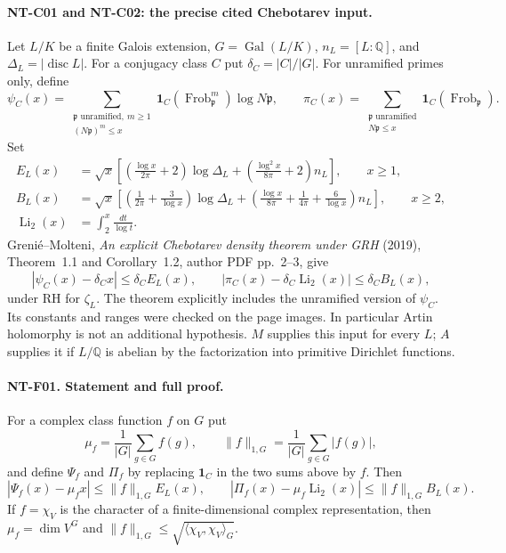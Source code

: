 \paragraph{NT-C01 and NT-C02: the precise cited Chebotarev input.}
Let $L/K$ be a finite Galois extension, $G=\operatorname{Gal}(L/K)$,
$n_L=[L:\mathbb Q]$, and $\Delta_L=|\operatorname{disc}L|$.
For a conjugacy class $C$ put $\delta_C=|C|/|G|$.  For unramified
primes only, define
\[
 \psi_C(x)=\sum_{\substack{\mathfrak p\text{ unramified},\ m\ge1\\
                    (N\mathfrak p)^m\le x}}
 \mathbf1_C(\operatorname{Frob}_{\mathfrak p}^{m})\log N\mathfrak p,
 \qquad
 \pi_C(x)=\sum_{\substack{\mathfrak p\text{ unramified}\\N\mathfrak p\le x}}
             \mathbf1_C(\operatorname{Frob}_{\mathfrak p}).
\]
Set
\begin{align*}
 E_L(x)&=\sqrt{x}\left[
       \left(\frac{\log x}{2\pi}+2\right)\log\Delta_L+
       \left(\frac{\log^2x}{8\pi}+2\right)n_L\right],\qquad x\ge1,\\
 B_L(x)&=\sqrt{x}\left[
       \left(\frac1{2\pi}+\frac3{\log x}\right)\log\Delta_L+
       \left(\frac{\log x}{8\pi}+\frac1{4\pi}+\frac6{\log x}\right)n_L
                         \right],\qquad x\ge2,\\
 \operatorname{Li}_2(x)&=\int_2^x\frac{dt}{\log t}.
\end{align*}
Greni\'e--Molteni, \emph{An explicit Chebotarev density theorem under GRH}
(2019), Theorem~1.1 and Corollary~1.2, author PDF pp.~2--3, give
\[
 |\psi_C(x)-\delta_Cx|\le\delta_C E_L(x),\qquad
 |\pi_C(x)-\delta_C\operatorname{Li}_2(x)|\le\delta_C B_L(x),
\tag{NT-C}
\]
under RH for $\zeta_L$.  The theorem explicitly includes the unramified
version of $\psi_C$.  Its constants and ranges were checked on the page
images.  In particular Artin holomorphy is not an additional hypothesis.
$M$ supplies this input for every $L$; $A$ supplies it if $L/\mathbb Q$
is abelian by the factorization into primitive Dirichlet functions.

\paragraph{NT-F01. Statement and full proof.}
For a complex class function $f$ on $G$ put
\[
 \mu_f=\frac1{|G|}\sum_{g\in G}f(g),\qquad
 \|f\|_{1,G}=\frac1{|G|}\sum_{g\in G}|f(g)|,
\]
and define $\Psi_f$ and $\Pi_f$ by replacing $\mathbf1_C$ in the two
sums above by $f$.  Then
\[
 |\Psi_f(x)-\mu_fx|\le\|f\|_{1,G}E_L(x),\qquad
 |\Pi_f(x)-\mu_f\operatorname{Li}_2(x)|\le\|f\|_{1,G}B_L(x).
\tag{NT-F01}
\]
If $f=\chi_V$ is the character of a finite-dimensional complex
representation, then $\mu_f=\dim V^G$ and
$\|f\|_{1,G}\le\sqrt{\langle\chi_V,\chi_V\rangle_G}$.

